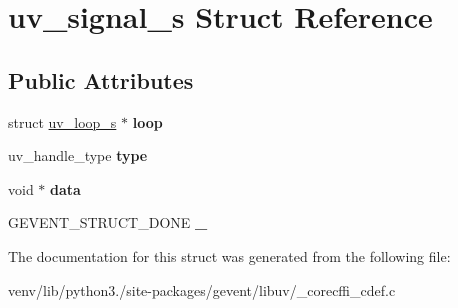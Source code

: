 \hypertarget{structuv__signal__s}{}\section{uv\+\_\+signal\+\_\+s Struct Reference}
\label{structuv__signal__s}
\subsection*{Public Attributes}
\begin{DoxyCompactItemize}
\item 
\mbox{\label{structuv__signal__s_a82fc133d44b43c32ec21e0fda69701c4}} 
struct \hyperlink{structuv__loop__s}{uv\+\_\+loop\+\_\+s} $\ast$ {\bfseries loop}
\item 
\mbox{\label{structuv__signal__s_a3a28862ddac11ef6eb404c986b2f4569}} 
uv\+\_\+handle\+\_\+type {\bfseries type}
\item 
\mbox{\label{structuv__signal__s_afb514943ee756d74c54be0b4af20aa31}} 
void $\ast$ {\bfseries data}
\item 
\mbox{\label{structuv__signal__s_ab2aebfb35759416a095f22eee51b1fbf}} 
G\+E\+V\+E\+N\+T\+\_\+\+S\+T\+R\+U\+C\+T\+\_\+\+D\+O\+NE {\bfseries \+\_\+}
\end{DoxyCompactItemize}


The documentation for this struct was generated from the following file\+:\begin{DoxyCompactItemize}
\item 
venv/lib/python3./site-\/packages/gevent/libuv/\+\_\+corecffi\+\_\+cdef.\+c\end{DoxyCompactItemize}
